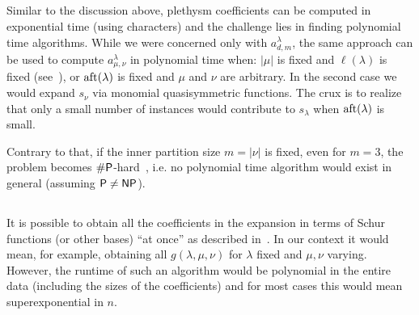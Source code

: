 \documentclass[11pt]{amsart}
\theoremstyle{plain}
\theoremstyle{definition}
\numberwithin{equation}{section}
\newcommand{\la}{\lambda}
\def\P{{{\rm{\textsf{P}} }}}
\def\SP{{{\rm{\textsf{\#P}}}}}
\def\NP{{{\rm{\textsf{NP}} }}}
\def\la{\lambda}
\begin{document}
\subsection{}\label{sec:rem_pleth}
Similar to the discussion above, plethysm coefficients can be computed in exponential time (using characters) and the challenge lies in finding polynomial time algorithms. 
While we were concerned only with $a^\la_{d,m}$, the same approach can be used to compute $a^\la_{\mu,\nu}$ in polynomial time when:
$|\mu|$ is fixed and $\ell(\la)$ is fixed (see~\cite{kahle2016plethysm}), or ${\rm aft}(\la)$ is fixed and $\mu$ and $\nu$ are arbitrary. In the second case we would expand $s_\nu$ via monomial quasisymmetric functions. The crux is to realize that only a small number of instances would contribute to $s_\la$ when ${\rm aft}(\la)$ is small. 

Contrary to that, if the inner partition size $m=|\nu|$ is fixed, even for $m=3$, the problem becomes $\SP$-hard~\cite{FI20}, i.e. no polynomial time algorithm would exist in general (assuming $\P \neq \NP$).



\subsection{}
It is possible to obtain all the coefficients in the expansion in terms of Schur functions (or other bases) ``at once'' as described in~\cite{barvinok1997sparse}. In our context it would mean, for example, obtaining all $g(\la,\mu,\nu)$ for $\la$ fixed and $\mu,\nu$ varying. However, the runtime of such an algorithm would be polynomial in the entire data (including the sizes of the coefficients) and for most cases this would mean superexponential in $n$. 






















%
%
\end{document}
